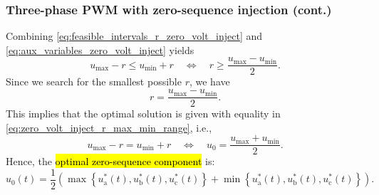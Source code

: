 \begin{frame}
    \frametitle{Three-phase PWM with zero-sequence injection (cont.)}
    Combining \eqref{eq:feasible_intervals_r_zero_volt_inject} and \eqref{eq:aux_variables_zero_volt_inject} yields
    \begin{equation}
        u_\mathrm{max} - r \leq u_\mathrm{min} + r \quad \Leftrightarrow \quad r \geq \frac{u_\mathrm{max} - u_\mathrm{min}}{2}.
        \label{eq:zero_volt_inject_r_max_min_range}
    \end{equation} \pause
    Since we search for the smallest possible $r$, we have
    \begin{equation}
        r = \frac{u_\mathrm{max} - u_\mathrm{min}}{2}.
    \end{equation} \pause
    This implies that the optimal solution is given with equality in \eqref{eq:zero_volt_inject_r_max_min_range}, i.e.,
    \begin{equation}
        u_\mathrm{max} - r = u_\mathrm{min} + r \quad \Leftrightarrow \quad u_0 = \frac{u_\mathrm{max} + u_\mathrm{min}}{2}.
    \end{equation} \pause
    Hence, the \hl{optimal zero-sequence component} is:
    \begin{equation}
        u_0(t) = \frac{1}{2}\left(\max\left\{u^*_\mathrm{a}(t), u^*_\mathrm{b}(t), u^*_\mathrm{c}(t)\right\} + \min\left\{u^*_\mathrm{a}(t), u^*_\mathrm{b}(t), u^*_\mathrm{c}(t)\right\}\right).
    \end{equation}
\end{frame}

